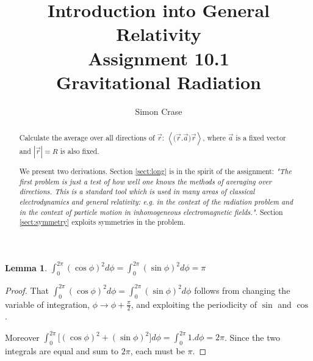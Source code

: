 \documentclass[]{article}
\title{Introduction into General Relativity\\Assignment 10.1\\Gravitational Radiation}
\author{Simon Crase}
\newtheorem{lemma}{Lemma}
\begin{document}
\maketitle

\begin{abstract}
	
	Calculate the average over all directions of $\vec{r}$: $\left\langle \big(\vec{r}.\vec{a}\big)\vec{r} \right\rangle$, where $\vec{a}$ is a fixed vector and $|\vec{r}|=R$ is also fixed.
	
	We present two derivations. Section \ref{sect:long} is in the spirit of the assignment: \emph{"The first problem is just a test of how well one knows the methods of averaging over directions. This is a standard tool which is used in many areas of classical electrodynamics and general relativity: e.g. in the context of the radiation problem and in the context of particle motion in inhomogeneous electromagnetic fields."}. Section \ref{sect:symmetry}  exploits symmetries in the problem.
\end{abstract}

\tableofcontents

\begin{lemma}\label{lemma:i1}
	$\int_{0}^{2\pi}(\cos\phi)^2  d\phi = \int_{0}^{2\pi}(\sin\phi)^2  d\phi=\pi$
\end{lemma}
\begin{proof}
	That $\int_{0}^{2\pi}(\cos\phi)^2  d\phi = \int_{0}^{2\pi}(\sin\phi)^2  d\phi$ follows from changing the variable of integration, $\phi\rightarrow\phi+\frac{\pi}{2}$, and exploiting the periodicity of $\sin$ and $\cos$. 
	
	Moreover $\int_{0}^{2\pi}\big[(\cos\phi)^2  +(\sin\phi)^2\big] d\phi=\int_{0}^{2\pi}1. d\phi=2\pi$. Since the two integrals are equal and sum to $2\pi$, each must be $\pi$.
\end{proof}
\end{document}
